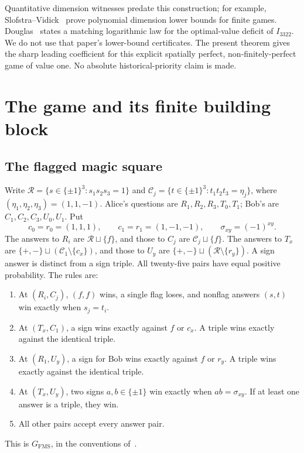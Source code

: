\documentclass[11pt]{article}
\theoremstyle{definition}
\newcommand{\FMS}{G_{\mathrm{FMS}}}
\newcommand{\sq}{\sqcup}
\begin{document}
Quantitative dimension witnesses predate this construction; for example,
Slofstra--Vidick~\cite{SV} prove polynomial dimension lower bounds for
finite games. Douglas~\cite[Theorem 6]{DouglasRate} states a matching
logarithmic law for the optimal-value deficit of $I_{3322}$. We do not
use that paper's lower-bound certificates. The present theorem gives
the sharp leading coefficient for this explicit spatially perfect,
non-finitely-perfect game of value one. No absolute historical-priority
claim is made.

\section{The game and its finite building block}\label{sec:game}
\subsection{The flagged magic square}
Write $\mathcal R=\{s\in\{\pm1\}^3:s_1s_2s_3=1\}$ and
$\mathcal C_j=\{t\in\{\pm1\}^3:t_1t_2t_3=\eta_j\}$, where $(\eta_1,\eta_2,\eta_3)=(1,1,-1)$. Alice's questions are $R_1,R_2,R_3,T_0,T_1$; Bob's are $C_1,C_2,C_3,U_0,U_1$. Put
\[
c_0=r_0=(1,1,1),\qquad c_1=r_1=(1,-1,-1),\qquad \sigma_{xy}=(-1)^{xy}.
\]
The answers to $R_i$ are $\mathcal R\sq\{f\}$, and those to $C_j$ are $\mathcal C_j\sq\{f\}$. The answers to $T_x$ are $\{+,-\}\sq(\mathcal C_1\setminus\{c_x\})$, and those to $U_y$ are $\{+,-\}\sq(\mathcal R\setminus\{r_y\})$. A sign answer is distinct from a sign triple. All twenty-five pairs have equal positive probability. The rules are:
\begin{enumerate}
\item At $(R_i,C_j)$, $(f,f)$ wins, a single flag loses, and nonflag answers $(s,t)$ win exactly when $s_j=t_i$.
\item At $(T_x,C_1)$, a sign wins exactly against $f$ or $c_x$. A triple wins exactly against the identical triple.
\item At $(R_1,U_y)$, a sign for Bob wins exactly against $f$ or $r_y$. A triple wins exactly against the identical triple.
\item At $(T_x,U_y)$, two signs $a,b\in\{\pm1\}$ win exactly when $ab=\sigma_{xy}$. If at least one answer is a triple, they win.
\item All other pairs accept every answer pair.
\end{enumerate}
This is $\FMS$, in the conventions of~\cite{Mancinska}.
\end{document}
